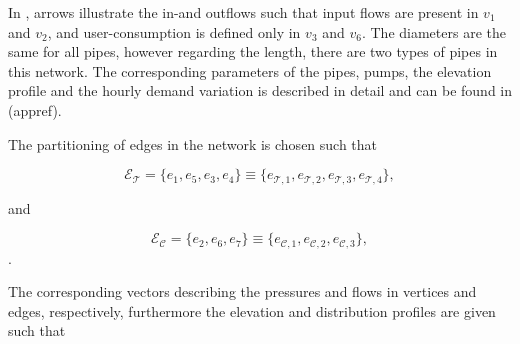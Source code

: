 In , arrows illustrate the in-and outflows such that input flows are present in $v_1 $ and $v_2$, and user-consumption is defined only in $v_3$ and $v_6$. The diameters are the same for all pipes, however regarding the length, there are two types of pipes in this network. The corresponding parameters of the pipes, pumps, the elevation profile and the hourly demand variation is described in detail and can be found in (appref). 

The partitioning of edges in the network is chosen such that

\begin{equation}
  \label{edgeorientation_example1_T}
  \mathcal{E}_{\mathcal{T}} = \{ e_1, e_5, e_3, e_4 \} \equiv \{ e_{\mathcal{T},1}, e_{\mathcal{T},2}, e_{\mathcal{T},3}, e_{\mathcal{T},4}  \},
\end{equation}

and

\begin{equation}
\label{edgeorientation_example1_C}
  \mathcal{E}_\mathcal{C} = \{e_2, e_6, e_7\} \equiv \{e_{\mathcal{C},1}, e_{\mathcal{C},2}, e_{\mathcal{C},3}\},
\end{equation}.

The corresponding vectors describing the pressures and flows in vertices and edges, respectively, furthermore the elevation and distribution profiles are given such that

